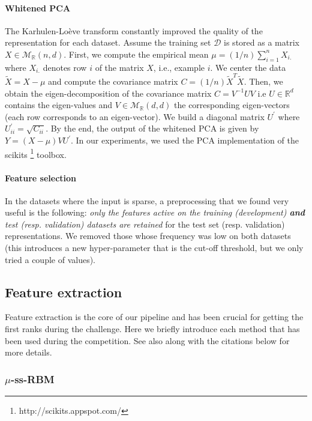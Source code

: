 \paragraph{Whitened PCA} The Karhulen-Lo\`{e}ve transform constantly improved the
quality of the representation for each dataset. Assume the training set
$\mathcal{D}$ is stored as a matrix $X\in\mathcal{M}_\mathbb{R}(n,d)$. First,
we compute the empirical mean $\mu=(1/n)\sum_{i=1}^n X_{i.}$ where $X_{i.}$
denotes row $i$ of the matrix $X$, i.e., example $i$. 
We center the data $\tilde{X}=X-\mu$ and
compute the covariance matrix $C=(1/n)\tilde{X}^T\tilde{X}$.  Then, we obtain the
eigen-decomposition of the covariance matrix $C=V^{-1}UV$ i.e
$U\in\mathbb{R}^d$ contains the eigen-values and
$V\in\mathcal{M}_{\mathbb{R}}(d,d)$ the corresponding eigen-vectors (each row
corresponds to an eigen-vector).  We build a diagonal matrix $U^{'}$ where
$U^{'}_{ii}=\sqrt{C_{ii}}$.  By the end, the output of the whitened PCA is
given by $Y=(X-\mu)VU^{'}$. In our experiments, we used the PCA 
implementation of the scikits
\footnote{http://scikits.appspot.com/} toolbox. 


\paragraph{Feature selection} In the datasets where the input is sparse, a
preprocessing that we found very useful is the following: {\em only the
features active on the training (development) {\bf and} test (resp. validation)
datasets are retained} for the test set (resp. validation) representations.  We
removed those whose frequency was low on both datasets (this introduces a new
hyper-parameter that is the cut-off threshold, but we only tried a couple of
values).

\subsection{Feature extraction}

Feature extraction is the core of our pipeline and has been crucial for getting
the first ranks during the challenge. Here we briefly introduce each method
that has been used during the competition. See also \citep{Bengio-DL-2011}
along with the citations below for more details.

\subsubsection{$\mu$-ss-RBM}

